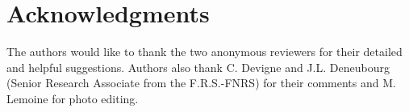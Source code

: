 	\section{Acknowledgments}   
The authors would like to thank the two anonymous reviewers for their detailed and helpful suggestions. Authors also thank C. Devigne and J.L. Deneubourg (Senior Research Associate from the F.R.S.-FNRS) for their comments and M. Lemoine for photo editing.

\clearpage
    
    
            
            
            
